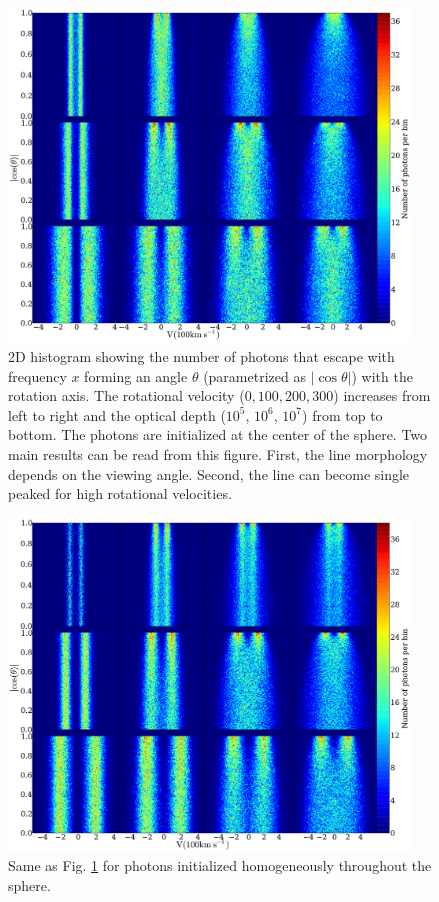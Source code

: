 \begin{figure}
\begin{center}
\includegraphics[width=0.95\textwidth]{Figures/f2.pdf}
\end{center}
\caption{
2D histogram showing the number of photons that escape with frequency
$x$ forming an angle $\theta$ (parametrized as $|\cos\theta|$) with the
rotation axis.
The rotational velocity ($0,100,200,300$\kms) increases from left to
right and the optical depth ($10^5$, $10^6$, $10^7$) from top to
bottom.
The \ly photons are initialized at the center of the sphere.
Two main results can be read from this figure.
First, the line morphology depends on the viewing angle.
Second, the line can become single peaked for high rotational
velocities.
\label{fig:CentralSpec} }
\end{figure}
\begin{figure}
\begin{center}
\includegraphics[width=0.95\textwidth]{Figures/f3.pdf}
\end{center}
\caption{Same as Fig. \ref{fig:CentralSpec} for \ly photons
initialized homogeneously throughout the sphere.
\label{fig:HomSpec}}
\end{figure}
